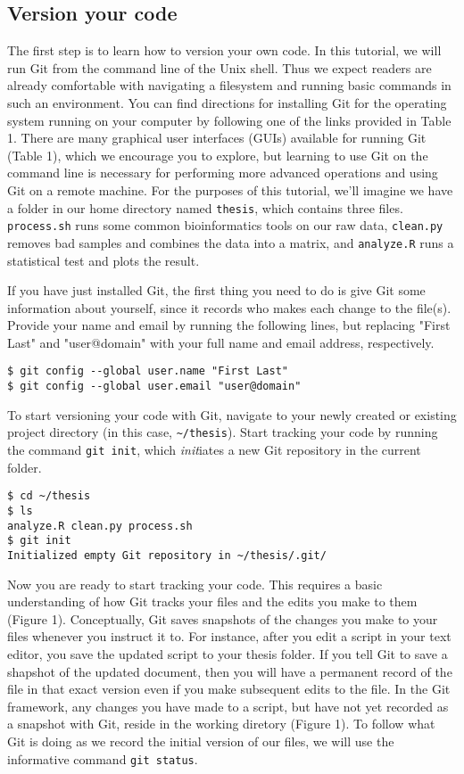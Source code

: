 \subsection{Version your code}

The first step is to learn how to version your own code.
In this tutorial, we will run Git from the command line of the Unix shell.
Thus we expect readers are already comfortable with navigating a filesystem and running basic commands in such an environment.
You can find directions for installing Git for the operating system running on your computer by following one of the links provided in Table 1.
There are many graphical user interfaces (GUIs) available for running Git (Table 1), which we encourage you to explore, but learning to use Git on the command line is necessary for performing more advanced operations and using Git on a remote machine.
For the purposes of this tutorial, we'll imagine we have a folder in our home directory named \verb|thesis|, which contains three files.
\verb|process.sh| runs some common bioinformatics tools on our raw data, \verb|clean.py| removes bad samples and combines the data into a matrix, and \verb|analyze.R| runs a statistical test and plots the result.

If you have just installed Git, the first thing you need to do is give Git some information about yourself, since it records who makes each change to the file(s).
Provide your name and email by running the following lines, but replacing "First Last" and "user@domain" with your full name and email address, respectively.

\begin{lstlisting}
$ git config --global user.name "First Last"
$ git config --global user.email "user@domain"
\end{lstlisting}

To start versioning your code with Git, navigate to your newly created or existing project directory (in this case, \verb|~/thesis|).
Start tracking your code by running the command \verb|git init|, which \textit{init}iates a new Git repository in the current folder.

\begin{lstlisting}
$ cd ~/thesis
$ ls
analyze.R clean.py process.sh
$ git init
Initialized empty Git repository in ~/thesis/.git/
\end{lstlisting}

Now you are ready to start tracking your code.
This requires a basic understanding of how Git tracks your files and the edits you make to them (Figure 1).
Conceptually, Git saves snapshots of the changes you make to your files whenever you instruct it to.
For instance, after you edit a script in your text editor, you save the updated script to your thesis folder.
If you tell Git to save a shapshot of the updated document, then you will have a permanent record of the file in that exact version even if you make subsequent edits to the file.
In the Git framework, any changes you have made to a script, but have not yet recorded as a snapshot with Git, reside in the working diretory (Figure 1).
To follow what Git is doing as we record the initial version of our files, we will use the informative command \verb|git status|.

